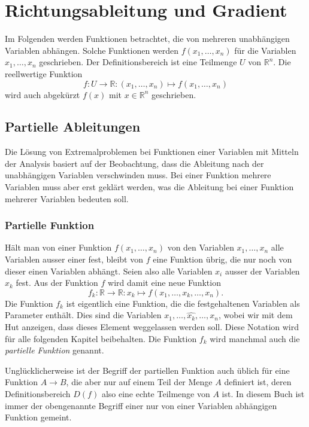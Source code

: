 %
%
%
\section{Richtungsableitung und Gradient
\label{buch:fuvar:section:richtungsableitung}}
Im Folgenden werden Funktionen betrachtet, die von mehreren unabhängigen
Variablen abhängen.
Solche Funktionen werden $f(x_1,\dots,x_n)$ für die Variablen
$x_1,\dots,x_n$ geschrieben.
Der Definitionsbereich ist eine Teilmenge $U$ von $\mathbb{R}^n$.
Die reellwertige Funktion
\[
f\colon U\to\mathbb{R} : (x_1,\dots,x_n) \mapsto f(x_1,\dots, x_n)
\]
wird auch abgekürzt $f(x)$ mit $x\in\mathbb{R}^n$ geschrieben.

%
%
\subsection{Partielle Ableitungen}
Die Lösung von Extremalproblemen bei Funktionen einer Variablen
mit Mitteln der Analysis basiert auf der Beobachtung, dass die Ableitung
nach der unabhängigen Variablen verschwinden muss.
Bei einer Funktion mehrere Variablen muss aber erst geklärt werden,
was die Ableitung bei einer Funktion mehrerer Variablen bedeuten soll.

%
%
\subsubsection{Partielle Funktion}
Hält man von einer Funktion $f(x_1,\dots,x_n)$ von den Variablen
$x_1,\dots,x_n$ alle Variablen ausser einer fest, bleibt von $f$ eine
Funktion übrig, die nur noch von dieser einen Variablen abhängt.
Seien also alle Variablen $x_i$ ausser der Variablen $x_k$ fest.
Aus der Funktion $f$ wird damit eine neue Funktion
\[
f_k
\colon
\mathbb{R} \to \mathbb{R}
:
x_k \mapsto f(x_1,\dots,x_k,\dots,x_n).
\]
Die Funktion $f_k$ ist eigentlich eine Funktion, die die festgehaltenen
Variablen als Parameter enthält.
Dies sind die Variablen $x_1,\dots,\widehat{x_k},\dots,x_n$, wobei
wir mit dem Hut anzeigen, dass dieses Element weggelassen werden soll.
Diese Notation wird für alle folgenden Kapitel beibehalten.
Die Funktion $f_k$ wird manchmal auch die {\em partielle Funktion}
%
%
genannt.

Unglücklicherweise ist der Begriff der partiellen Funktion auch 
üblich für eine Funktion $A\to B$, die aber nur auf einem Teil
der Menge $A$ definiert ist, deren Definitionsbereich $D(f)$ also
eine echte Teilmenge von $A$ ist.
In diesem Buch ist immer der obengenannte Begriff einer nur von einer
Variablen abhängigen Funktion gemeint.

